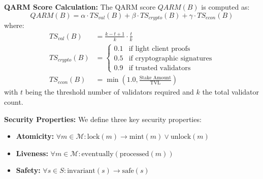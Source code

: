 \documentclass[runningheads]{llncs}
\begin{document}
\textbf{QARM Score Calculation:} The QARM score $QARM(B)$ is computed as:
\begin{equation}
QARM(B) = \alpha \cdot TS_{val}(B) + \beta \cdot TS_{crypto}(B) + \gamma \cdot TS_{econ}(B)
\end{equation}
where:
\begin{align}
TS_{val}(B) &= \frac{k - t + 1}{k} \cdot \frac{t}{k} \\
TS_{crypto}(B) &= \begin{cases} 
    0.1 & \text{if light client proofs} \\
    0.5 & \text{if cryptographic signatures} \\
    0.9 & \text{if trusted validators}
\end{cases} \\
TS_{econ}(B) &= \min\left(1.0, \frac{\text{Stake Amount}}{\text{TVL}}\right)
\end{align}
with $t$ being the threshold number of validators required and $k$ the total validator count.

\textbf{Security Properties:} We define three key security properties:
\begin{itemize}
    \item \textbf{Atomicity:} $\forall m \in \mathcal{M}: \text{lock}(m) \rightarrow \text{mint}(m) \vee \text{unlock}(m)$
    \item \textbf{Liveness:} $\forall m \in \mathcal{M}: \text{eventually}(\text{processed}(m))$
    \item \textbf{Safety:} $\forall s \in S: \text{invariant}(s) \rightarrow \text{safe}(s)$
\end{itemize}
\end{document}
